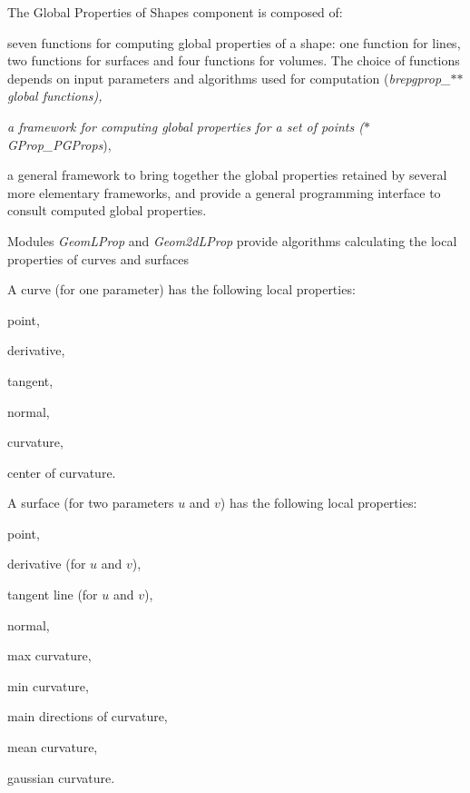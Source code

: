The Global Properties of Shapes component is composed of\+:
\begin{DoxyItemize}
\item seven functions for computing global properties of a shape\+: one function for lines, two functions for surfaces and four functions for volumes. The choice of functions depends on input parameters and algorithms used for computation ({\itshape brepgprop\+\_\+$\ast$$\ast$ global functions),}
\item {\itshape a framework for computing global properties for a set of points ($\ast$\+G\+Prop\+\_\+\+P\+G\+Props}),
\item a general framework to bring together the global properties retained by several more elementary frameworks, and provide a general programming interface to consult computed global properties.
\end{DoxyItemize}

Modules {\itshape Geom\+L\+Prop} and {\itshape Geom2d\+L\+Prop} provide algorithms calculating the local properties of curves and surfaces

A curve (for one parameter) has the following local properties\+:
\begin{DoxyItemize}
\item point,
\item derivative,
\item tangent,
\item normal,
\item curvature,
\item center of curvature.
\end{DoxyItemize}

A surface (for two parameters $u$ and $v$) has the following local properties\+:
\begin{DoxyItemize}
\item point,
\item derivative (for $u$ and $v$),
\item tangent line (for $u$ and $v$),
\item normal,
\item max curvature,
\item min curvature,
\item main directions of curvature,
\item mean curvature,
\item gaussian curvature.
\end{DoxyItemize}

